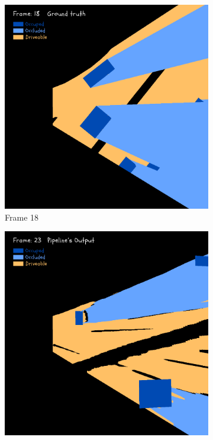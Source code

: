 \begin{figure}[htbp]
\begin{subfigure}[b]{0.19\linewidth}
        \vspace{0.5em}
        \includegraphics[width=\linewidth]{images/experiments/occ2_masks/gt_occ_mask_colored_18.png}
        \caption{Frame 18}
        \label{subfig:occ_masks_frame18}
    \end{subfigure}
    \hfill
    \begin{subfigure}[b]{0.19\linewidth}
        \centering
        \includegraphics[width=\linewidth]{images/experiments/occ2_masks/dt_occ_mask_colored_23.png}

\end{subfigure}
\end{figure}
